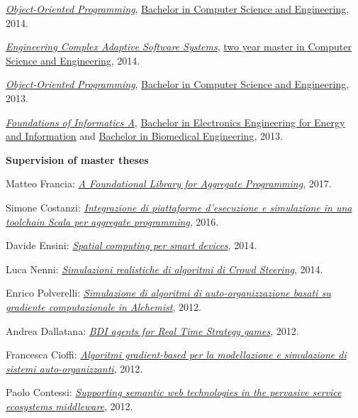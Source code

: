 \begin{outerlist}
\begin{innerlist}
      \item \href{http://archive.fo/8jzEp}{\textit{Object-Oriented Programming}}, \href{http://archive.fo/UM5wl}{Bachelor in Computer Science and Engineering}, 2014.
      \item \href{http://archive.fo/h8JCD}{\textit{Engineering Complex Adaptive Software Systems}}, \href{http://archive.fo/toz5c}{two year master in Computer Science and Engineering}, 2014.
      \item \href{http://archive.fo/0Gr16}{\textit{Object-Oriented Programming}}, \href{http://archive.fo/UM5wl}{Bachelor in Computer Science and Engineering}, 2013.
      \item \href{http://archive.fo/XZFR0}{\textit{Foundations of Informatics A}}, \href{http://archive.fo/30rN0}{Bachelor in Electronics Engineering for Energy and Information} and \href{http://archive.fo/jW52L}{Bachelor in Biomedical Engineering}, 2013.
    \end{innerlist}
\item[] \textbf{Supervision of master theses} %
    \begin{innerlist}
      \item Matteo Francia: \href{http://amslaurea.unibo.it/13090/}{\textit{A Foundational Library for Aggregate Programming}}, 2017.
      \item Simone Costanzi: \href{http://amslaurea.unibo.it/10519/}{\textit{Integrazione di piattaforme d'esecuzione e simulazione in una toolchain Scala per aggregate programming}}, 2016.
      \item Davide Ensini: \href{http://amslaurea.unibo.it/7990/}{\textit{Spatial computing per smart devices}}, 2014.
      \item Luca Nenni: \href{http://amslaurea.unibo.it/6927/}{\textit{Simulazioni realistiche di algoritmi di Crowd Steering}}, 2014.
      \item Enrico Polverelli: \href{http://amslaurea.unibo.it/5293/}{\textit{Simulazione di algoritmi di auto-organizzazione basati su gradiente computazionale in Alchemist}}, 2012.
      \item Andrea Dallatana: \href{http://amslaurea.unibo.it/4217/}{\textit{BDI agents for Real Time Strategy games}}, 2012.
      \item Francesca Cioffi: \href{http://amslaurea.unibo.it/4088/}{\textit{Algoritmi gradient-based per la modellazione e simulazione di sistemi auto-organizzanti}}, 2012.
      \item Paolo Contessi: \href{http://amslaurea.unibo.it/4074/}{\textit{Supporting semantic web technologies in the pervasive service ecosystems middleware}}, 2012.

\end{innerlist}
\end{outerlist}
